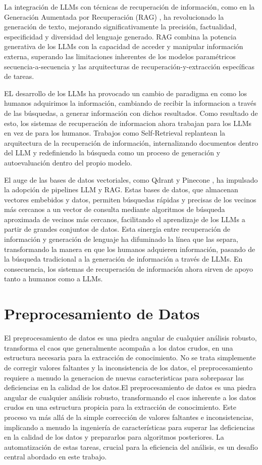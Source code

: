 La integración de LLMs con técnicas de recuperación de información, como en la Generación Aumentada por Recuperación (RAG) \cite{lewis2020retrieval}, ha revolucionado la generación de texto, mejorando significativamente la precisión, factualidad, especificidad y diversidad del lenguaje generado. RAG combina la potencia generativa de los LLMs con la capacidad de acceder y manipular información externa, superando las limitaciones inherentes de los modelos paramétricos secuencia-a-secuencia y las arquitecturas de recuperación-y-extracción específicas de tareas.

EL desarrollo de los LLMs ha provocado un cambio de paradigma en como los humanos adquirimos la información, cambiando de recibir la informacion a través de las búsquedas, a generar información con dichos resultados. Como resultado de esto, los sistemas de recuperación de informacion ahora trabajan para los LLMs en vez de para los humanos. Trabajos como Self-Retrieval \cite{tang2024self} replantean la arquitectura de la recuperación de información, internalizando documentos dentro del LLM y redefiniendo la búsqueda como un proceso de generación y autoevaluación dentro del propio modelo.

El auge de las bases de datos vectoriales, como Qdrant \cite{qdrant} y Pinecone \cite{pinecone}, ha impulsado la adopción de pipelines LLM y RAG. Estas bases de datos, que almacenan vectores embebidos y datos, permiten búsquedas rápidas y precisas de los vecinos más cercanos a un vector de consulta mediante algoritmos de búsqueda aproximada de vecinos más cercanos, facilitando el aprendizaje de los LLMs a partir de grandes conjuntos de datos. Esta sinergia entre recuperación de información y generación de lenguaje ha difuminado la línea que las separa, transformando la manera en que los humanos adquieren información, pasando de la búsqueda tradicional a la generación de información a través de LLMs. En consecuencia, los sistemas de recuperación de información ahora sirven de apoyo tanto a humanos como a LLMs.

\section{Preprocesamiento de Datos}

El preprocesamiento de datos es una piedra angular de cualquier análisis robusto, transforma el caos que generalmente acompaña a los datos crudos, en una estructura necesaria para la extracción de conocimiento. No se trata simplemente de corregir valores faltantes y la inconsistencia de los datos, el preprocesamiento requiere a menudo la generacion de nuevas caracteristicas para sobrepasar las deficiencias en la calidad de los datos.El preprocesamiento de datos es una piedra angular de cualquier análisis robusto, transformando el caos inherente a los datos crudos en una estructura propicia para la extracción de conocimiento. Este proceso va más allá de la simple corrección de valores faltantes e inconsistencias, implicando a menudo la ingeniería de características para superar las deficiencias en la calidad de los datos y prepararlos para algoritmos posteriores. La automatización de estas tareas, crucial para la eficiencia del análisis, es un desafío central abordado en este trabajo.

